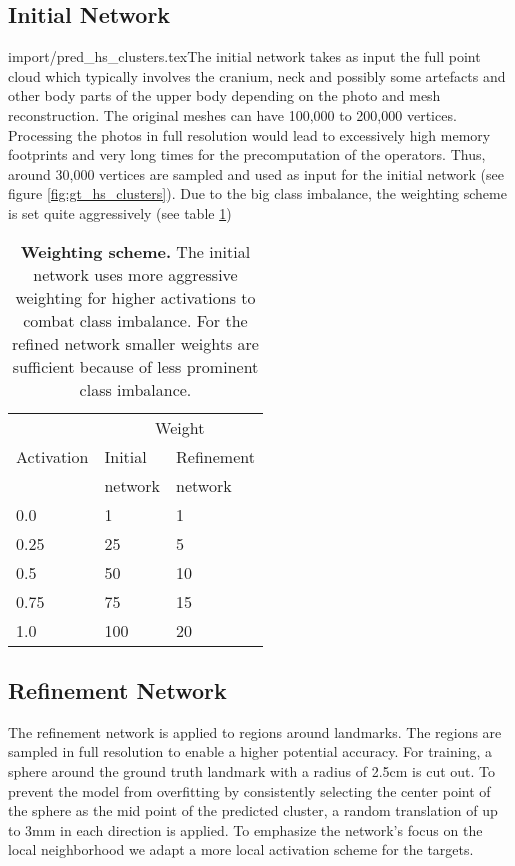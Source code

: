 \documentclass[class=article, crop=false]{standalone}
\begin{document}
\subsection{Initial Network}{import/pred_hs_clusters.tex}The initial network takes as input the full point cloud which typically involves the cranium, neck and possibly some artefacts and other body parts of the upper body depending on the photo and mesh reconstruction. The original meshes can have 100,000 to 200,000 vertices. Processing the photos in full resolution would lead to excessively high memory footprints and very long times for the precomputation of the operators. Thus, around 30,000 vertices are sampled and used as input for the initial network (see figure \ref{fig:gt_hs_clusters}). Due to the big class imbalance, the weighting scheme is set quite aggressively (see table \ref{tab:weighting-scheme})
\begin{table}[]
\centering
\begin{tabular}[t]{lll}\toprule
 & \multicolumn{2}{c}{Weight} \\
\cmidrule(lr){2-3}
Activation & Initial & Refinement\\
& network & network\\
\hline
0.0        & 1  & 1    \\
0.25       & 25 & 5    \\
0.5        & 50 & 10    \\
0.75       & 75 & 15    \\
1.0        & 100 & 20  \\ \bottomrule
\end{tabular}
\caption{\textbf{Weighting scheme.} The initial network uses more aggressive weighting for higher activations to combat class imbalance. For the refined network smaller weights are sufficient because of less prominent class imbalance.}
\label{tab:weighting-scheme}
\end{table}

\subsection{Refinement Network}
The refinement network is applied to regions around landmarks. The regions are sampled in full resolution to enable a higher potential accuracy. For training, a sphere around the ground truth landmark with a radius of 2.5cm is cut out. To prevent the model from overfitting by consistently selecting the center point of the sphere as the mid point of the predicted cluster, a random translation of up to 3mm in each direction is applied. To emphasize the network's focus on the local neighborhood we adapt a more local activation scheme for the targets.
\end{document}
